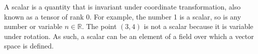 \documentclass{article}
\begin{document}
A scalar is a quantity that is invariant under coordinate transformation, also known as a tensor of rank 0. For example, the number 1 is a scalar, so is any number or variable $n\in\mathbb{R}$. The point $(3,4)$ is not a scalar because it is variable under rotation.
As such, a scalar can be an element of a field over which a vector space is defined.
\end{document}
